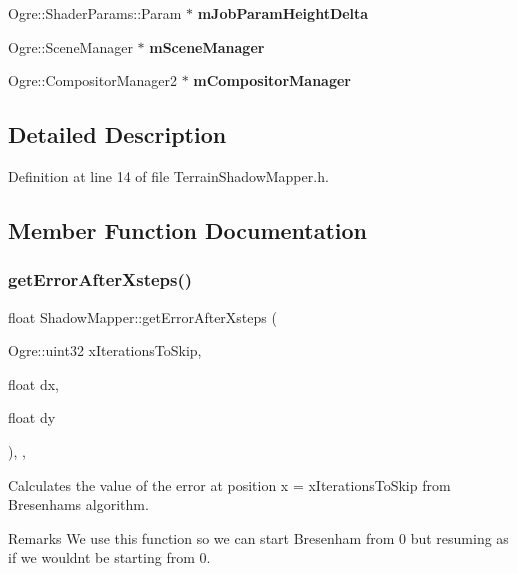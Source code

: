 \begin{DoxyCompactItemize}
Ogre\+::\+Shader\+Params\+::\+Param $\ast$ {\bfseries m\+Job\+Param\+Height\+Delta}
\item 
\mbox{\label{class_shadow_mapper_aceb39870c1d238da7f6c91001a6fa860}} 
Ogre\+::\+Scene\+Manager $\ast$ {\bfseries m\+Scene\+Manager}
\item 
\mbox{\label{class_shadow_mapper_afa176dac98a1f33e9b27b6bff4e8e8f0}} 
Ogre\+::\+Compositor\+Manager2 $\ast$ {\bfseries m\+Compositor\+Manager}
\end{DoxyCompactItemize}


\subsection{Detailed Description}


Definition at line 14 of file Terrain\+Shadow\+Mapper.\+h.



\subsection{Member Function Documentation}
\mbox{\label{class_shadow_mapper_ae95d31a0216503b8838738e959e32b1c}} 
\subsubsection{\texorpdfstring{get\+Error\+After\+Xsteps()}{getErrorAfterXsteps()}}
{\footnotesize\ttfamily float Shadow\+Mapper\+::get\+Error\+After\+Xsteps (\begin{DoxyParamCaption}\item[{Ogre\+::uint32}]{x\+Iterations\+To\+Skip,  }\item[{float}]{dx,  }\item[{float}]{dy }\end{DoxyParamCaption})\hspace{0.3cm}{\ttfamily [inline]}, {\ttfamily [static]}, {\ttfamily [private]}}

Calculates the value of the error at position x = x\+Iterations\+To\+Skip from Bresenham\textquotesingle{}s algorithm. \begin{DoxyRemark}{Remarks}
We use this function so we can start Bresenham from \textquotesingle{}0\textquotesingle{} but resuming as if we wouldn\textquotesingle{}t be starting from 0. 
\end{DoxyRemark}

